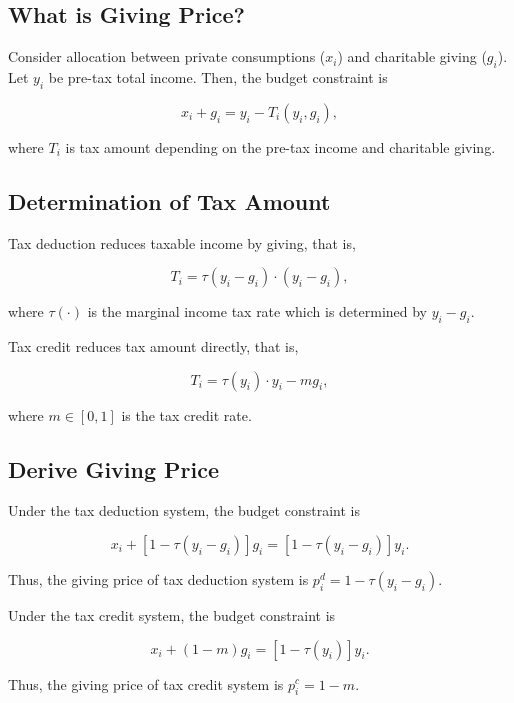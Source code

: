 \documentclass[ review  , 3p ]{elsarticle}
\begin{document}
  \hypertarget{what-is-giving-price}{%
  \subsection{What is Giving Price?}\label{what-is-giving-price}}

  Consider allocation between private consumptions (\(x_i\)) and charitable giving (\(g_i\)).
  Let \(y_i\) be pre-tax total income.
  Then, the budget constraint is

  \[
      x_i + g_i = y_i - T_i(y_i, g_i),
  \]

  where \(T_i\) is tax amount depending on the pre-tax income and charitable giving.

  \hypertarget{determination-of-tax-amount}{%
  \subsection{Determination of Tax Amount}\label{determination-of-tax-amount}}

  Tax deduction reduces taxable income by giving, that is,

  \[
      T_i = \tau(y_i - g_i) \cdot (y_i - g_i),
  \]

  where \(\tau(\cdot)\) is the marginal income tax rate which is determined by \(y_i - g_i\).

  Tax credit reduces tax amount directly, that is,

  \[
      T_i = \tau(y_i)\cdot y_i - m g_i,
  \]

  where \(m \in [0, 1]\) is the tax credit rate.

  \hypertarget{derive-giving-price}{%
  \subsection{Derive Giving Price}\label{derive-giving-price}}

  Under the tax deduction system, the budget constraint is

  \[
      x_i + [1 - \tau(y_i - g_i)]g_i = [1 - \tau(y_i - g_i)] y_i.
  \]

  Thus, the giving price of tax deduction system is \(p_i^{d} = 1 - \tau(y_i - g_i)\).

  Under the tax credit system, the budget constraint is

  \[
      x_i + (1 - m) g_i = [1 - \tau(y_i)] y_i.
  \]

  Thus, the giving price of tax credit system is \(p_i^c = 1 - m\).
\end{document}
